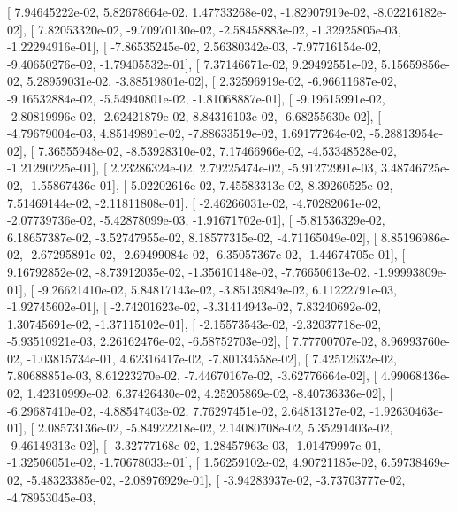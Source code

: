 \documentclass{article}
\begin{document}
       [  7.94645222e-02,   5.82678664e-02,   1.47733268e-02,
         -1.82907919e-02,  -8.02216182e-02],
       [  7.82053320e-02,  -9.70970130e-02,  -2.58458883e-02,
         -1.32925805e-03,  -1.22294916e-01],
       [ -7.86535245e-02,   2.56380342e-03,  -7.97716154e-02,
         -9.40650276e-02,  -1.79405532e-01],
       [  7.37146671e-02,   9.29492551e-02,   5.15659856e-02,
          5.28959031e-02,  -3.88519801e-02],
       [  2.32596919e-02,  -6.96611687e-02,  -9.16532884e-02,
         -5.54940801e-02,  -1.81068887e-01],
       [ -9.19615991e-02,  -2.80819996e-02,  -2.62421879e-02,
          8.84316103e-02,  -6.68255630e-02],
       [ -4.79679004e-03,   4.85149891e-02,  -7.88633519e-02,
          1.69177264e-02,  -5.28813954e-02],
       [  7.36555948e-02,  -8.53928310e-02,   7.17466966e-02,
         -4.53348528e-02,  -1.21290225e-01],
       [  2.23286324e-02,   2.79225474e-02,  -5.91272991e-03,
          3.48746725e-02,  -1.55867436e-01],
       [  5.02202616e-02,   7.45583313e-02,   8.39260525e-02,
          7.51469144e-02,  -2.11811808e-01],
       [ -2.46266031e-02,  -4.70282061e-02,  -2.07739736e-02,
         -5.42878099e-03,  -1.91671702e-01],
       [ -5.81536329e-02,   6.18657387e-02,  -3.52747955e-02,
          8.18577315e-02,  -4.71165049e-02],
       [  8.85196986e-02,  -2.67295891e-02,  -2.69499084e-02,
         -6.35057367e-02,  -1.44674705e-01],
       [  9.16792852e-02,  -8.73912035e-02,  -1.35610148e-02,
         -7.76650613e-02,  -1.99993809e-01],
       [ -9.26621410e-02,   5.84817143e-02,  -3.85139849e-02,
          6.11222791e-03,  -1.92745602e-01],
       [ -2.74201623e-02,  -3.31414943e-02,   7.83240692e-02,
          1.30745691e-02,  -1.37115102e-01],
       [ -2.15573543e-02,  -2.32037718e-02,  -5.93510921e-03,
          2.26162476e-02,  -6.58752703e-02],
       [  7.77700707e-02,   8.96993760e-02,  -1.03815734e-01,
          4.62316417e-02,  -7.80134558e-02],
       [  7.42512632e-02,   7.80688851e-03,   8.61223270e-02,
         -7.44670167e-02,  -3.62776664e-02],
       [  4.99068436e-02,   1.42310999e-02,   6.37426430e-02,
          4.25205869e-02,  -8.40736336e-02],
       [ -6.29687410e-02,  -4.88547403e-02,   7.76297451e-02,
          2.64813127e-02,  -1.92630463e-01],
       [  2.08573136e-02,  -5.84922218e-02,   2.14080708e-02,
          5.35291403e-02,  -9.46149313e-02],
       [ -3.32777168e-02,   1.28457963e-03,  -1.01479997e-01,
         -1.32506051e-02,  -1.70678033e-01],
       [  1.56259102e-02,   4.90721185e-02,   6.59738469e-02,
         -5.48323385e-02,  -2.08976929e-01],
       [ -3.94283937e-02,  -3.73703777e-02,  -4.78953045e-03,
\end{document}
